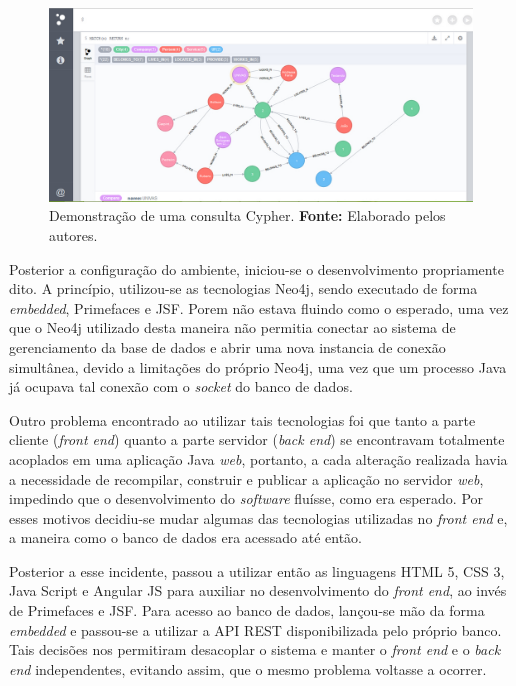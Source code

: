 \begin{figure}[h!]
	\centerline{\includegraphics[scale=0.4]{./imagens/neo4j2.jpg}}
	\caption[Demonstração de uma consulta Cypher.]
	{Demonstração de uma consulta Cypher. \textbf{Fonte:} Elaborado pelos autores.}
	\label{fig:exemplo1}
\end{figure}
 
\newpage

\par Posterior a configuração do ambiente, iniciou-se o desenvolvimento propriamente dito. A princípio, utilizou-se as tecnologias Neo4j, sendo executado de forma \textit{embedded}, Primefaces e JSF. Porem não estava fluindo como o esperado, uma vez que o Neo4j utilizado desta maneira não permitia conectar ao sistema de gerenciamento da base de dados e abrir uma nova instancia de conexão simultânea, devido a limitações do próprio Neo4j, uma vez que um processo Java já ocupava tal conexão com o \textit{socket} do banco de dados.

\par Outro problema encontrado ao utilizar tais tecnologias foi que tanto a parte cliente (\textit{front end}) quanto a parte servidor (\textit{back end}) se encontravam totalmente acoplados em uma aplicação Java \textit{web}, portanto, a cada alteração realizada havia a necessidade de recompilar, construir e publicar a aplicação no servidor \textit{web}, impedindo que o desenvolvimento do \textit{software} fluísse, como era esperado. Por esses motivos decidiu-se mudar algumas das tecnologias utilizadas no \textit{front end} e, a maneira como o banco de dados era acessado até então. 

\par Posterior a esse incidente, passou a utilizar então as linguagens HTML 5, CSS 3, Java Script e Angular JS para auxiliar no desenvolvimento do \textit{front end}, ao invés de Primefaces e JSF. Para acesso ao banco de dados, lançou-se mão da forma \textit{embedded} e passou-se a utilizar a API REST disponibilizada pelo próprio banco. Tais decisões nos permitiram desacoplar o sistema e manter o \textit{front end} e o \textit{back end} independentes, evitando assim, que o mesmo problema voltasse a ocorrer. 

